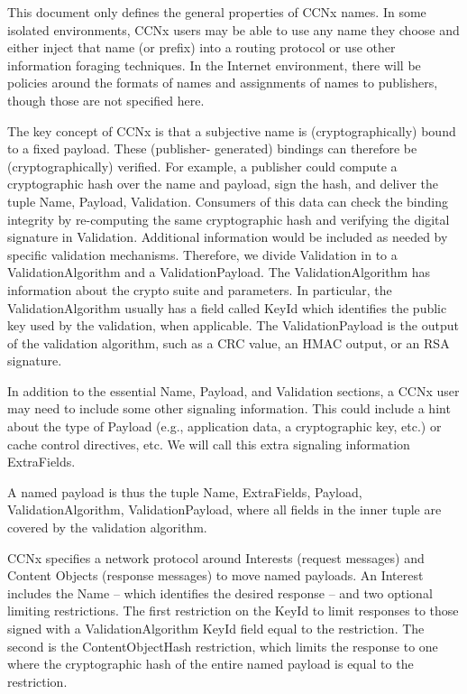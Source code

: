 \documentclass[12pt]{article}
\begin{document}
This document only defines the general properties of CCNx names.  In
some isolated environments, CCNx users may be able to use any name
they choose and either inject that name (or prefix) into a routing
protocol or use other information foraging techniques.  In the
Internet environment, there will be policies around the formats of
names and assignments of names to publishers, though those are not
specified here.

The key concept of CCNx is that a subjective name is
(cryptographically) bound to a fixed payload.  These (publisher-
generated) bindings can therefore be (cryptographically) verified.
For example, a publisher could compute a cryptographic hash over the
name and payload, sign the hash, and deliver the tuple {Name,
Payload, Validation}.  Consumers of this data can check the binding
integrity by re-computing the same cryptographic hash and verifying
the digital signature in Validation.  Additional information would be
included as needed by specific validation mechanisms.  Therefore, we
divide Validation in to a ValidationAlgorithm and a
ValidationPayload.  The ValidationAlgorithm has information about the
crypto suite and parameters.  In particular, the ValidationAlgorithm
usually has a field called KeyId which identifies the public key used
by the validation, when applicable.  The ValidationPayload is the
output of the validation algorithm, such as a CRC value, an HMAC
output, or an RSA signature.

In addition to the essential Name, Payload, and Validation sections,
a CCNx user may need to include some other signaling information.
This could include a hint about the type of Payload (e.g.,
application data, a cryptographic key, etc.) or cache control
directives, etc.  We will call this extra signaling information
ExtraFields.

A named payload is thus the tuple {{Name, ExtraFields, Payload,
ValidationAlgorithm}, ValidationPayload}, where all fields in the
inner tuple are covered by the validation algorithm.

CCNx specifies a network protocol around Interests (request messages)
and Content Objects (response messages) to move named payloads.  An
Interest includes the Name -- which identifies the desired response
-- and two optional limiting restrictions.  The first restriction on
the KeyId to limit responses to those signed with a
ValidationAlgorithm KeyId field equal to the restriction.  The second
is the ContentObjectHash restriction, which limits the response to
one where the cryptographic hash of the entire named payload is equal
to the restriction.
\end{document}
